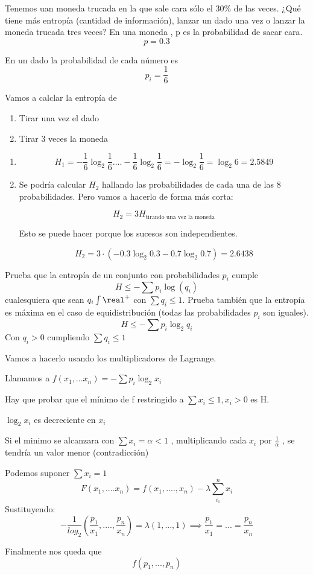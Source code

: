 \begin{problem}[2]
 	Tenemos uan moneda trucada en la que sale cara sólo el 30\% de las veces. ¿Qué tiene más entropía (cantidad de información), lanzar un dado una vez o lanzar la moneda trucada tres veces?
 	\solution
 	En una moneda , p es la probabilidad de sacar cara.
 	$$p = 0.3$$

 	En un dado la probabilidad de cada número es
 	$$p_i = \frac{1}{6}$$

 	Vamos a calclar la entropía de
 	\begin{enumerate}
 		\item Tirar una vez el dado
 		\item Tirar 3 veces la moneda
 	\end{enumerate}

 	\begin{enumerate}
 		\item $$H_1 = - \frac{1}{6} \log_2 \frac{1}{6} .... - \frac{1}{6} \log_2 \frac{1}{6} = - \log_2 \frac{1}{6} = \log_2 6 = 2.5849$$

 		\item Se podría calcular $H_2$ hallando las probabilidades de cada una de las 8 probabilidades. Pero vamos a hacerlo de forma más corta:

 		$$H_2 = 3H_{\text{tirando una vez la moneda}}$$

 		Esto se puede hacer porque los sucesos son independientes.

 		$$H_2 = 3\cdot(-0.3 \log_2 0.3 - 0.7 \log_2 0.7) = 2.6438$$
 	\end{enumerate}
 \end{problem}
\begin{problem}[3]
	Prueba que la entropía de un conjunto con probabilidades $p_i$ cumple
	\[H \leq -\sum p_i \log(q_i)\]
	cualesquiera que sean $q_i\int \real^+$ con $\sum q_i \leq 1$. Prueba también que la entropía es máxima en el caso de equidistribución (todas las probabilidades $p_i$ son iguales).
	\solution
	$$H \leq - \sum p_i \log_2 q_i$$
	Con $q_i > 0$ cumpliendo $\sum q_i \leq 1$

	Vamos a hacerlo usando los multiplicadores de Lagrange.

	Llamamos a $f(x_1 , ... x_n) = - \sum p_i \log_2 x_i$

	Hay que probar que el mínimo de f restringido a $\sum x_i \leq 1 , x_i > 0$ es H.

	$\log_2 x_i$ es decreciente en $x_i$

	Si el minimo se alcanzara con $\sum x_i = \alpha < 1$ , multiplicando cada $x_i$ por $\frac{1}{\alpha}$ , se tendría un valor menor (contradicción)

	Podemos suponer $\sum x_i = 1$
	$$F(x_1 , .... x_n) = f(x_1, ...., x_n) - \lambda \sum_{i_1}^{n} x_i$$
	Sustituyendo:
	$$-\frac{1}{log_2}(\frac{p_1}{x_1}, .... , \frac{p_n}{x_n}) = \lambda (1,...,1) \implies \frac{p_1}{x_1} = ... = \frac{p_n}{x_n}$$

	Finalmente nos queda que
	$$f(p_1, ... ,p_n)$$
\end{problem}

